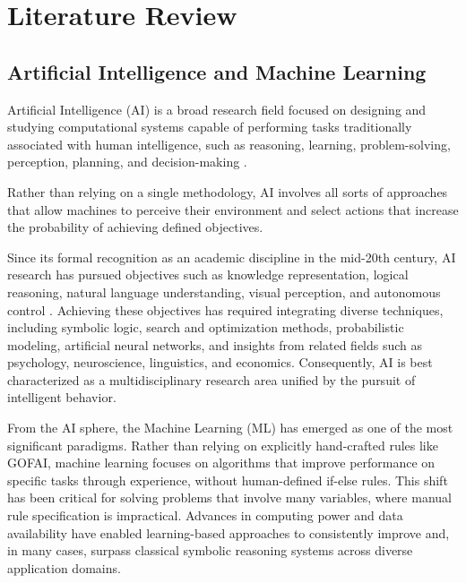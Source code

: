 
\chapter{Literature Review}
\label{chap:lit-review}


\ifpdf
    \graphicspath{{2_literature_review/figures/PNG/}{2_literature_review/figures/PDF/}{2_literature_review/figures/}}
\else
    \graphicspath{{2_literature_review/figures/EPS/}{2_literature_review/figures/}}
\fi



\section{Artificial Intelligence and Machine Learning}

Artificial Intelligence (AI) is a broad research field focused on designing and studying computational systems capable of performing tasks traditionally associated with human intelligence, such as reasoning, learning, problem-solving, perception, planning, and decision-making \cite{russell2021}.


 Rather than relying on a single methodology, AI involves all sorts of approaches that allow machines to perceive their environment and select actions that increase the probability of achieving defined objectives.

Since its formal recognition as an academic discipline in the mid-20th century, AI research has pursued objectives such as knowledge representation, logical reasoning, natural language understanding, visual perception, and autonomous control \cite{russell2021}. Achieving these objectives has required integrating diverse techniques, including symbolic logic, search and optimization methods, probabilistic modeling, artificial neural networks, and insights from related fields such as psychology, neuroscience, linguistics, and economics. Consequently, AI is best characterized as a multidisciplinary research area unified by the pursuit of intelligent behavior.

From the AI sphere, the Machine Learning (ML) has emerged as one of the most significant paradigms. Rather than relying on explicitly hand-crafted rules like GOFAI, machine learning focuses on algorithms that improve performance on specific tasks through experience, without human-defined if-else rules. This shift has been critical for solving problems that involve many variables, where manual rule specification is impractical. Advances in computing power and data availability have enabled learning-based approaches to consistently improve and, in many cases, surpass classical symbolic reasoning systems across diverse application domains.

